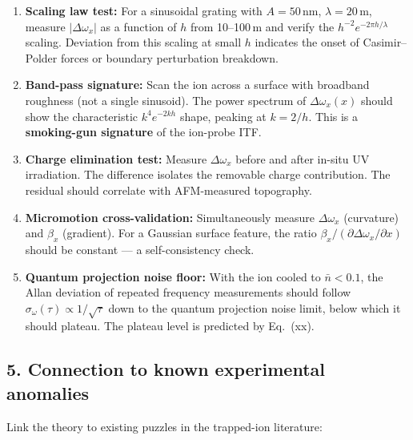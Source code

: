 \documentclass[11pt,a4paper]{article}
\begin{document}
\begin{enumerate}[label=P\arabic*., leftmargin=*]
    \item \textbf{Scaling law test:} For a sinusoidal grating with
          $A = 50$\,nm, $\lambda = 20$\,\textmu m, measure
          $|\Delta\omega_x|$ as a function of $h$ from 10--100\,\textmu m
          and verify the $h^{-2}e^{-2\pi h/\lambda}$ scaling.  Deviation
          from this scaling at small $h$ indicates the onset of Casimir--Polder
          forces or boundary perturbation breakdown.
    
    \item \textbf{Band-pass signature:} Scan the ion across a surface with
          broadband roughness (not a single sinusoid).  The power spectrum
          of $\Delta\omega_x(x)$ should show the characteristic
          $k^4 e^{-2kh}$ shape, peaking at $k = 2/h$.  This is a
          \textbf{smoking-gun signature} of the ion-probe ITF.
    
    \item \textbf{Charge elimination test:} Measure $\Delta\omega_x$ before
          and after in-situ UV irradiation.  The difference isolates the
          removable charge contribution.  The residual should correlate
          with AFM-measured topography.
    
    \item \textbf{Micromotion cross-validation:} Simultaneously measure
          $\Delta\omega_x$ (curvature) and $\beta_x$ (gradient).  For a
          Gaussian surface feature, the ratio
          $\beta_x / (\partial\Delta\omega_x/\partial x)$ should be
          constant --- a self-consistency check.
    
    \item \textbf{Quantum projection noise floor:} With the ion cooled to
          $\bar{n} < 0.1$, the Allan deviation of repeated frequency
          measurements should follow $\sigma_\omega(\tau) \propto 1/\sqrt{\tau}$
          down to the quantum projection noise limit, below which it should
          plateau.  The plateau level is predicted by Eq.~(xx).
\end{enumerate}

\subsection{5. Connection to known experimental anomalies}

Link the theory to existing puzzles in the trapped-ion literature:
\end{document}
